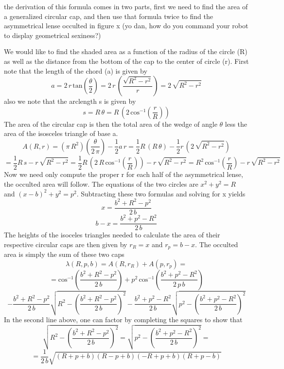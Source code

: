 \documentclass[12pt,preprint]{aastex}
\begin{document}
the derivation of this formula comes in two parts, first we need to find the area of
a generalized circular cap, and then use that formula twice to find the asymmetrical
lense occulted in figure x (yo dan, how do you command your robot to display geometrical sexiness?)

%

We would like to find the shaded area as a function of the radius of the circle (R)
as well as the distance from the bottom of the cap to the center of circle (r).
First note that the length of the chord (a) is given by
\[
a = 2 \, r \, \mathrm{tan} \left( \frac{\theta}{2} \right) = 2 \, r \,
\left( \frac{\sqrt{R^2 - r^2}}{r} \right) = 2 \, \sqrt{R^2 - r^2}
\]
also we note that the arclength s is given by
\[
s = R \, \theta = R \, \left( 2 \, \mathrm{cos}^{-1} \left( \frac{r}{R} \right) \right)
\]
The area of the circular cap is then the total area of the wedge of angle $\theta$
less the area of the isosceles triangle of base a.
\[
A(R,r) = (\pi \, R^2) \left( \frac{\theta}{2 \, \pi} \right) - \frac{1}{2} a \,
r = \frac{1}{2} R \, (R \, \theta) - \frac{1}{2} r \, ( 2 \, \sqrt{R^2 - r^2} )
\]
\[
 = \frac{1}{2} R \, s - r \, \sqrt{R^2 - r^2} = \frac{1}{2} R \, \left( 2 \, R
 \, \mathrm{cos}^{-1} \left( \frac{r}{R} \right) \right) - r \, \sqrt{R^2 - r^2}
 = R^2 \, \mathrm{cos}^{-1} \left( \frac{r}{R} \right) - r \, \sqrt{R^2 - r^2}
\]
Now we need only compute the proper r for each half of the asymmetrical lense,
the occulted area will follow. The equations of the two circles are $x^2 + y^2 = R$
and $(x-b)^2 + y^2 = p^2$.  Subtracting these two formulas and solving for x yields
\[
x = \frac{b^2 + R^2 - p^2}{2 \, b}
\]
\[
b - x = \frac{b^2 + p^2 - R^2}{2 \, b}
\]
The heights of the isoceles triangles needed to calculate the area of their respective
circular caps are then given by $r_R = x$ and $r_p = b-x$.  The occulted area is
simply the sum of these two caps
\[
\lambda(R,p,b) = A(R,r_R) + A(p,r_p) =
\]
\[
 = \mathrm{cos}^{-1} \left( \frac{b^2 + R^2 - p^2}{2 \, b } \right) + p^2
 \, \mathrm{cos}^{-1} \left( \frac{b^2 + p^2 - R^2}{2 \, p \, b} \right)
\]
\[
- \frac{b^2 + R^2 - p^2}{2 \, b} \sqrt{R^2 - \left( \frac{b^2 + R^2 - p^2}{2 \, b}
\right)^2 } - \frac{b^2 + p^2 -R^2}{2 \, b} \sqrt{ p^2 - \left( \frac{b^2 + p^2
- R^2}{2 \, b} \right)^2 }
\]
In the second line above, one can factor by completing the squares to show that
\[
\sqrt{R^2 - \left( \frac{b^2 + R^2 - p^2}{2 \, b} \right)^2 } =  \sqrt{ p^2 -
\left( \frac{b^2 + p^2 - R^2}{2 \, b} \right)^2 } =
\]
\[
 = \frac{1}{2 \, b} \sqrt{(R+p+b)(R-p+b)(-R+p+b)(R+p-b)}
\]
\end{document}
